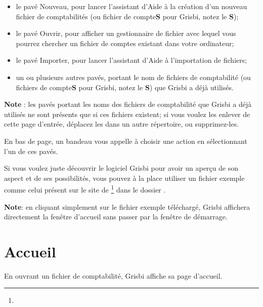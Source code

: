 \begin{itemize}
	\item le pavé Nouveau, pour lancer l'assistant d'Aide à la création d'un nouveau fichier de comptabilités (ou fichier de compte\textbf{S} pour Grisbi, notez le \textbf{S});
	\item le pavé Ouvrir, pour afficher un gestionnaire de fichier avec lequel vous pourrez chercher un fichier de comptes existant dans votre ordinateur;
	\item le pavé Importer, pour lancer l'assistant d'Aide à l'importation de fichiers;
	\item un ou plusieurs autres pavés, portant le nom de fichiers de comptabilité (ou fichiers de compte\textbf{S} pour Grisbi, notez le \textbf{S}) que Grisbi a déjà utilisés.
\end{itemize}

\newpage

\textbf{Note} : les pavés portant les noms des fichiers de comptabilité que Grisbi a déjà utilisés ne sont présents que si ces fichiers existent; si vous voulez les enlever de cette page d'entrée, déplacez les dans un autre répertoire, ou supprimez-les.


En bas de page, un bandeau vous appelle à choisir une action en sélectionnant l'un de ces pavés.


Si vous voulez juste découvrir le logiciel Grisbi pour avoir un aperçu de son aspect et de ses possibilités, vous pouvez à la place utiliser un fichier exemple comme celui présent sur le site de \footnote{\urlSourceForgeDocumentation{}} dans le dossier .		%


\textbf{Note}: en cliquant simplement sur le fichier exemple téléchargé, Grisbi affichera directement la fenêtre  d'accueil sans passer par la fenêtre de démarrage.

\section{Accueil\label{home}}

En ouvrant un fichier de comptabilité, Grisbi affiche sa page d'accueil.

